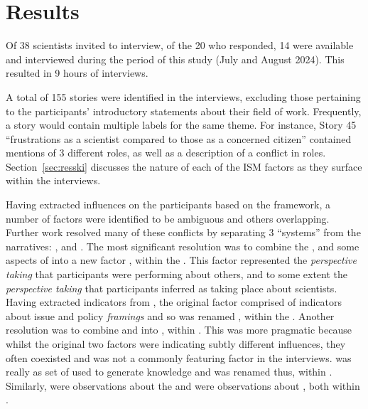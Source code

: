 \chapter{Results}\label{ch:results}

Of 38 scientists invited to interview, of the 20 who responded, 14 were available and interviewed during the period of this study  (July and August 2024). This resulted in 9\textonehalf{} hours of interviews. 

A total of 155 stories were identified in the interviews, excluding those pertaining to the participants' introductory statements about their field of work. Frequently, a story would contain multiple labels for the same theme. For instance, Story 45 ``frustrations as a scientist compared to those as a concerned citizen'' contained mentions of 3 different roles, as well as a description of a conflict in roles. Section~\ref{sec:resski} discusses the nature of each of the ISM factors as they surface within the interviews.


Having extracted influences on the participants based on the \ISM{} framework, a number of factors were identified to be ambiguous and others overlapping. Further work resolved many of these conflicts by separating 3 ``systems'' from the narratives: \skiscip, \skiknow{} and \skiinte. The most significant resolution was to combine the \ISM{} \ismsn, \ismst{} and some aspects of \ismsm{} into a new factor \skipers, within the \skiinte. This factor represented the \emph{perspective taking} that participants were performing about others, and to some extent the \emph{perspective taking} that participants inferred as taking place about scientists. Having extracted \skipers{} indicators from \ismsm, the original \ISM{} factor comprised of indicators about issue and policy \emph{framings} and so was renamed \skifram, within the \skiknow. Another resolution was to combine \ISM{} \ismic{} and \ismia{} into \skiagen, within \skiinte. This was more pragmatic because whilst the original two factors were indicating subtly different influences, they often coexisted and \ismic{} was not a commonly featuring factor in the interviews. \ISM{} \ismmt{} was really as set of \skitech{} used to generate knowledge and was renamed thus, within \skiknow. Similarly, \ISM{} \ismmr{} were observations about the \skipoli{} and \ismmts{} were observations about \skieven{}, both within \skiscip.

